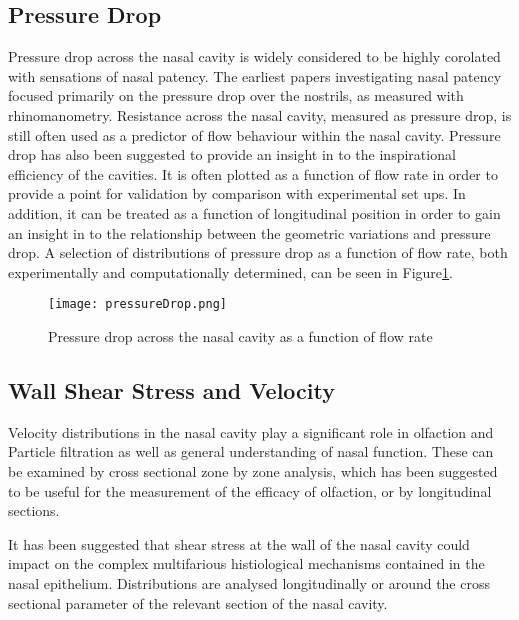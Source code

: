 \subsection{Pressure Drop}

Pressure drop across the nasal cavity is widely considered to be highly corolated with sensations of nasal patency\cite{Ottaviano2016}.
The earliest papers investigating nasal patency focused primarily on the pressure drop over the nostrils, as measured with rhinomanometry\cite{Martin1981}. 
Resistance across the nasal cavity, measured as pressure drop, is still often used as a predictor of flow behaviour within the nasal cavity\cite{Edelstein1996, Lindemann2008, WhanKim2007}. 
Pressure drop has also been suggested to provide an insight in to the inspirational efficiency of the cavities\cite{Lintermann2013}. 
It is often plotted as a function of flow rate in order to provide a point for validation by comparison with experimental set ups\cite{Wen2008, Inthavong2014}. 
In addition, it can be treated as a function of longitudinal position in order to gain an insight in to the relationship between the geometric variations and pressure drop\cite{Lintermann2013}. 
A selection of distributions of pressure drop as a function of flow rate, both experimentally and computationally determined, can be seen in Figure\ref{fig:pvf}. 


\begin{figure}
  \centering
  \texttt{[image: pressureDrop.png]}
  \caption{Pressure drop across the nasal cavity as a function of flow rate} \label{fig:pvf}
\centering
\end{figure}

 \subsection{Wall Shear Stress and Velocity}

Velocity distributions in the nasal cavity play a significant role in olfaction\cite{Ishikawa2009} and Particle filtration\cite{Inthavong2006, Wang2009a} as well as general understanding of nasal function\cite{Keyhani1995, Zhu2011, Lintermann2013}. 
These can be examined by cross sectional zone by zone analysis\cite{Keyhani1995, Zhu2011}, which has been suggested to be useful for the measurement of the efficacy of olfaction\cite{Zhu2011}, or by longitudinal sections\cite{Lintermann2013,Taylor2010}. 

It has been suggested that shear stress at the wall of the nasal cavity could impact on the complex multifarious histiological mechanisms contained in the nasal epithelium\cite{Elad2006}.
Distributions are analysed longitudinally\cite{Wen2008} or around the cross sectional parameter of the relevant section of the nasal cavity\cite{Burgos2014}. 

